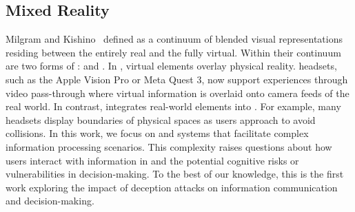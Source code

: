 \subsection{Mixed Reality}
Milgram and Kishino~\cite {milgram} defined \MR as a continuum of blended visual representations residing between the entirely real and the fully virtual. 
Within their continuum are two forms of \MR: \AR and \AV.
In \AR, virtual elements overlay physical reality. %
\VR headsets, such as the Apple Vision Pro or Meta Quest 3, now support \AR experiences through video pass-through where virtual information is overlaid onto camera feeds of the real world. In contrast, 
\AV integrates real-world elements into \VR. %
For example, many \VR headsets display boundaries of physical spaces as users approach to avoid collisions.
In this work, we focus on \AR and \AV systems that facilitate complex information processing scenarios. 
This complexity raises questions about how users interact with information in \MR and the potential cognitive risks or vulnerabilities in decision-making. %
To the best of our knowledge, this is the first work exploring the impact of \MR deception attacks on information communication and decision-making.




